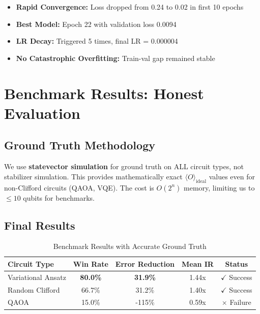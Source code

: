 \documentclass[11pt, a4paper]{article}
\begin{document}
\begin{itemize}
    \item \textbf{Rapid Convergence:} Loss dropped from 0.24 to 0.02 in first 10 epochs
    \item \textbf{Best Model:} Epoch 22 with validation loss 0.0094
    \item \textbf{LR Decay:} Triggered 5 times, final LR = 0.000004
    \item \textbf{No Catastrophic Overfitting:} Train-val gap remained stable
\end{itemize}

\section{Benchmark Results: Honest Evaluation}

\subsection{Ground Truth Methodology}

\begin{keyinsight}
We use \textbf{statevector simulation} for ground truth on ALL circuit types, not stabilizer simulation. This provides mathematically exact $\langle O \rangle_{\text{ideal}}$ values even for non-Clifford circuits (QAOA, VQE). The cost is $O(2^n)$ memory, limiting us to $\leq 10$ qubits for benchmarks.
\end{keyinsight}

\subsection{Final Results}

\begin{table}[H]
\centering
\caption{Benchmark Results with Accurate Ground Truth}
\begin{tabular}{@{}lcccc@{}}
\toprule
\textbf{Circuit Type} & \textbf{Win Rate} & \textbf{Error Reduction} & \textbf{Mean IR} & \textbf{Status} \\ \midrule
Variational Ansatz & \textbf{80.0\%} & \textbf{31.9\%} & 1.44x & $\checkmark$ Success \\
Random Clifford & 66.7\% & 31.2\% & 1.40x & $\checkmark$ Success \\
QAOA & 15.0\% & -115\% & 0.59x & $\times$ Failure \\
\bottomrule
\end{tabular}
\end{table}
\end{document}
